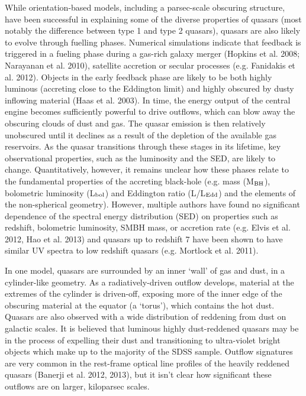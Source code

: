 While orientation-based models, including a parsec-scale obscuring structure, have been successful in explaining some of the diverse properties of quasars (most notably the difference between type 1 and type 2 quasars), quasars are also likely to evolve through fuelling phases. 
Numerical simulations indicate that feedback is triggered in a fueling phase during a gas-rich galaxy merger (Hopkins et al. 2008; Narayanan et al. 2010), satellite accretion or secular processes (e.g. Fanidakis et al. 2012). 
Objects in the early feedback phase are likely to be both highly luminous (accreting close to the Eddington limit) and highly obscured by dusty inflowing material (Haas et al. 2003). 
In time, the energy output of the  central engine becomes sufficiently powerful to drive outflows, which can blow away the obscuring clouds of dust and gas. 
The quasar emission is then relatively unobscured until it declines as a result of the depletion of the available gas reservoirs. 
As the quasar transitions through these stages in its lifetime, key observational properties, such as the luminosity and the SED, are likely to change. 
Quantitatively, however, it remains unclear how these phases relate to the fundamental properties of the accreting black-hole (e.g.  mass (M$_{\rm{BH}}$), bolometric luminosity (L$_{\rm{bol}}$) and Eddington ratio (L/L$_{\rm{Edd}}$) and the elements of the non-spherical geometry). 
However, multiple authors have found no significant dependence of the spectral energy distribution (SED) on properties such as redshift, bolometric luminosity, SMBH mass, or accretion rate (e.g. Elvis et al. 2012, Hao et al. 2013) and quasars up to redshift 7 have been shown to have similar UV spectra to low redshift quasars (e.g. Mortlock et al. 2011). 

In one model, quasars are surrounded by an inner `wall' of gas and dust, in a cylinder-like geometry. 
As a radiatively-driven outflow develops, material at the extremes of the cylinder is driven-off, exposing more of the inner edge of the obscuring material at the equator (a `torus'), which contains the hot dust. 
Quasars are also observed with a wide distribution of reddening from dust on galactic scales. 
It is believed that luminous highly dust-reddened quasars may be in the process of expelling their dust and transitioning to ultra-violet bright objects which make up to the majority of the SDSS sample. 
Outflow signatures are very common in the rest-frame optical \ha line profiles of the heavily reddened quasars (Banerji et al. 2012, 2013), but it isn't clear how significant these outflows are on larger, kiloparsec scales.


